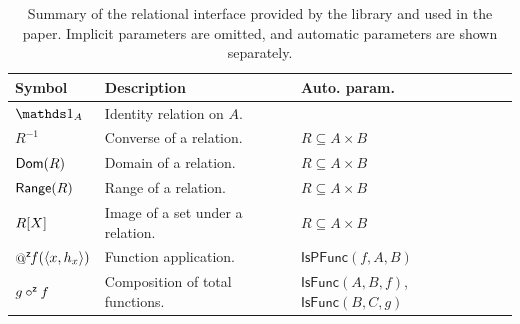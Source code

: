 \iffalse
  \begin{table}[t]
    \centering
    \caption{Summary of the relational interface provided by the library and used in the paper. Implicit parameters are omitted, and automatic parameters are shown separately.}
    \label{tab:rel-api}
    \small
    \begin{tabular}{lp{}p{}}
      \hline
      \textbf{Symbol}                                               & \textbf{Description} & \textbf{Auto. param.} \\
      \hline
      $\Id{A}$                                                      &
      Identity relation on $A$.                                     &
      \\

      $R^{-1}$                                                      &
      Converse of a relation.                                       &
      $R \subseteq A \times B$                                                                                     \\

      $\mathsf{Dom}(R)$                                                     &
      Domain of a relation.                                         &
      $R \subseteq A \times B$                                                                                     \\

      $\mathsf{Range}(R)$                                                     &
      Range of a relation.                                          &
      $R \subseteq A \times B$                                                                                     \\

      $R[X]$                                                &
      Image of a set under a relation.                              &
      $R \subseteq A \times B$                                                                                     \\

      $\fapply{f}{\langle x, h_x \rangle}$                          &
      Function application.                                         &
      $\mathsf{IsPFunc}(f, A, B)$                                                                                  \\

      $g \mathbin{\mathsf{\circ}^{\mathsf{z}}} f$                                          &
      Composition of total functions.                               &
      $\mathsf{IsFunc}(A, B, f)$,
      $\mathsf{IsFunc}(B, C, g)$                                                                                   \\


\end{tabular}
\end{table}
